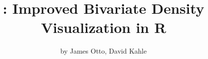 
\makeatletter
\def\maxwidth{ %
  \ifdim\Gin@nat@width>\linewidth
    \linewidth
  \else
    \Gin@nat@width
  \fi
}
\makeatother

\makeatletter
\newenvironment{kframe}{%
 \def\at@end@of@kframe{}%
 \ifinner\ifhmode%
  \def\at@end@of@kframe{\end{minipage}}%
  \begin{minipage}{\columnwidth}%
 \fi\fi%
 \def\FrameCommand##1{\hskip\@totalleftmargin \hskip-\fboxsep
 \colorbox{shadecolor}{##1}\hskip-\fboxsep
     \hskip-\linewidth \hskip-\@totalleftmargin \hskip\columnwidth}%
 \MakeFramed {\advance\hsize-\width
   \@totalleftmargin\z@ \linewidth\hsize
   \@setminipage}}%
 {\par\unskip\endMakeFramed%
 \at@end@of@kframe}
\makeatother

\newenvironment{knitrout}{}{} %



\renewcommand{\P}[1]{\mathrm{P} \left( #1 \right)}
\newcommand{\Ps}[1]{\mathrm{P} \left( #1 \right)}
\newcommand{\Pwrt}[2]{\mathrm{P}_{#1} \left( #2 \right)}
\newcommand{\Pswrt}[2]{\mathrm{P}_{#1} \left( #2 \right)}

\newcommand{\pl}[1]{{\fontfamily{\sfdefault}\selectfont #1}}
\newtheorem{definition}{Definition}

\newcommand{\PRRV}[1]{P\left[#1\right]}
\newcommand{\PRRVwrt}[2]{P_{#1}\left[#2\right]}
\newcommand{\ve}[1]{\textbf{#1}}
\newcommand{\mc}[1]{\mathcal{#1}}
\newcommand{\al}{\alpha}
\renewcommand{\th}{\theta}
\renewcommand{\R}{\mathbb{R}}






\title{: Improved Bivariate Density Visualization in R}
\author{by James Otto, David Kahle}

